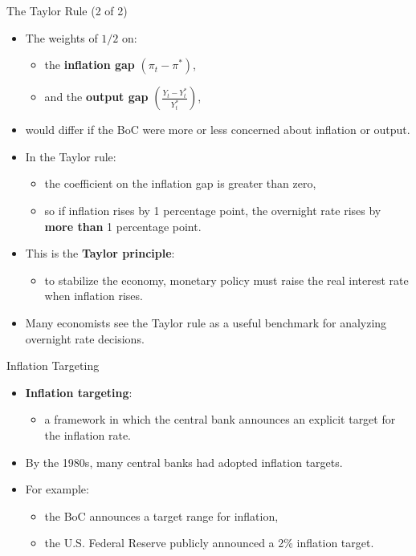 \documentclass[aspectratio=169]{beamer}
\begin{document}
\begin{frame}{The Taylor Rule (2 of 2)}
\transfade
\begin{itemize}
  \item The weights of \(1/2\) on:
  \begin{itemize}
    \item the \textbf{inflation gap} \((\pi_{t} - \pi^{*})\),
    \item and the \textbf{output gap} \(\left( \frac{Y_{t} - Y^{*}_{t}}{Y^{*}_{t}} \right)\),
  \end{itemize}
  \item would differ if the BoC were more or less concerned about inflation or output.
  \item In the Taylor rule:
  \begin{itemize}
    \item the coefficient on the inflation gap is greater than zero,
    \item so if inflation rises by 1 percentage point, the overnight rate rises by \textbf{more than} 1 percentage point.
  \end{itemize}
  \item This is the \textbf{Taylor principle}:
  \begin{itemize}
    \item to stabilize the economy, monetary policy must raise the real interest rate when inflation rises.
  \end{itemize}
  \item Many economists see the Taylor rule as a useful \alert{benchmark} for analyzing overnight rate decisions.
\end{itemize}
\end{frame}

\begin{frame}{Inflation Targeting}
\transfade
\begin{itemize}
  \item \textbf{Inflation targeting}:
  \begin{itemize}
    \item a framework in which the central bank announces an explicit target for the inflation rate.
  \end{itemize}
  \item By the 1980s, many central banks had adopted inflation targets.
  \item For example:
  \begin{itemize}
    \item the BoC announces a target range for inflation,
    \item the U.S. Federal Reserve publicly announced a 2\% inflation target.
  \end{itemize}
\end{itemize}
\end{frame}
\end{document}

